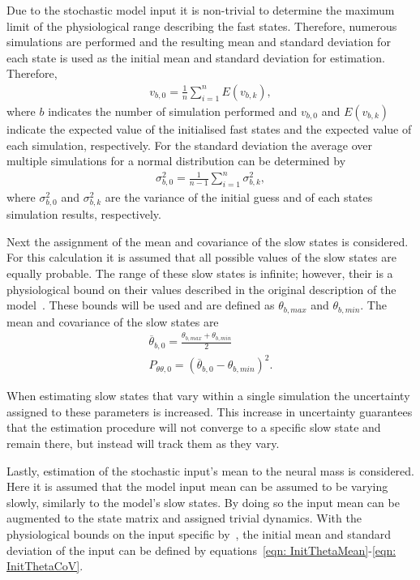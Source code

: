 Due to the stochastic model input it is non-trivial to determine the maximum limit of the physiological range describing the fast states. Therefore, numerous simulations are performed and the resulting mean and standard deviation for each state is used as the initial mean and standard deviation for estimation. Therefore, \begin{align}
v_{b,0} = \frac{1}{n}\sum\limits_{i=1}^n E(v_{b,k}), \end{align} where $b$ indicates the number of simulation performed and $v_{b,0}$ and $E(v_{b,k})$ indicate the expected value of the initialised fast states and the expected value of each simulation, respectively. For the standard deviation the average over multiple simulations for a normal distribution can be determined by \begin{align}
\sigma^2_{b,0} = \frac{1}{n-1}\sum\limits_{i=1}^n \sigma^2_{b,k},\end{align} where $\sigma^2_{b,0}$ and $\sigma^2_{b,k}$ are the variance of the initial guess and of each states simulation results, respectively.


Next the assignment of the mean and covariance of the slow states is considered. For this calculation it is assumed that all possible values of the slow states are equally probable. The range of these slow states is infinite; however, their is a physiological bound on their values described in the original description of the model~\citep{wendling2002epileptic}. These bounds will be used and are defined as $\theta_{b,max}$ and $\theta_{b,min}$. The mean and covariance of the slow states are\begin{align}
\label{eqn: InitThetaMean}
\overline{\theta}_{b,0} = \frac{\theta_{b,max}+\theta_{b,min}}{2}\\
\label{eqn: InitThetaCoV}
P_{\theta\theta,0} = (\overline{\theta}_{b,0}-\theta_{b,min})^2.
\end{align}

When estimating slow states that vary within a single simulation the uncertainty assigned to these parameters is increased. This increase in uncertainty guarantees that the estimation procedure will not converge to a specific slow state and remain there, but instead will track them as they vary. 

Lastly, estimation of the stochastic input's mean to the neural mass is considered. Here it is assumed that the model input mean can be assumed to be varying slowly, similarly to the model's slow states. By doing so the input mean can be augmented to the state matrix and assigned trivial dynamics. With the physiological bounds on the input specific by~\cite{wendling2002epileptic}, the initial mean and standard deviation of the input can be defined by equations~\ref{eqn: InitThetaMean}-\ref{eqn: InitThetaCoV}.

